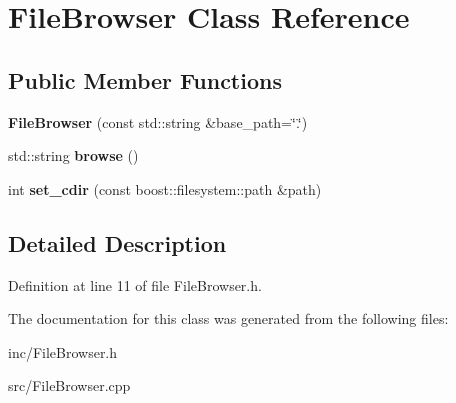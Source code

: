 \hypertarget{classFileBrowser}{}\section{File\+Browser Class Reference}
\label{classFileBrowser}
\subsection*{Public Member Functions}
\begin{DoxyCompactItemize}
\item 
\hypertarget{classFileBrowser_a6fbf64b13ec2e53f375e3e9ea3b1362a}{}{\bfseries File\+Browser} (const std\+::string \&base\+\_\+path=\char`\"{}.\char`\"{})\label{classFileBrowser_a6fbf64b13ec2e53f375e3e9ea3b1362a}

\item 
\hypertarget{classFileBrowser_a188c69f0ffb1bc2510df206035fcbfd9}{}std\+::string {\bfseries browse} ()\label{classFileBrowser_a188c69f0ffb1bc2510df206035fcbfd9}

\item 
\hypertarget{classFileBrowser_ae65bbe179dd98f44439fc25a2e46a024}{}int {\bfseries set\+\_\+cdir} (const boost\+::filesystem\+::path \&path)\label{classFileBrowser_ae65bbe179dd98f44439fc25a2e46a024}

\end{DoxyCompactItemize}


\subsection{Detailed Description}


Definition at line 11 of file File\+Browser.\+h.



The documentation for this class was generated from the following files\+:\begin{DoxyCompactItemize}
\item 
inc/File\+Browser.\+h\item 
src/File\+Browser.\+cpp\end{DoxyCompactItemize}
